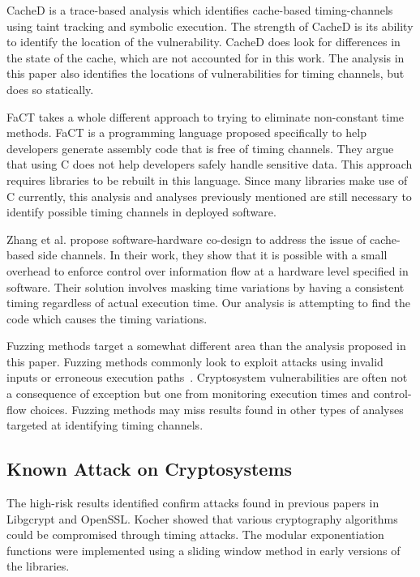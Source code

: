    CacheD is a trace-based analysis which identifies cache-based timing-channels
   using taint tracking and symbolic execution\cite{wang2017cached}. The
   strength of CacheD is its ability to identify the location of the
   vulnerability. CacheD does look for differences in the state of the cache,
   which are not accounted for in this work. The analysis in this paper also
   identifies the locations of vulnerabilities for timing channels, but does so
   statically.

   FaCT takes a whole different approach to trying to eliminate non-constant
   time methods\cite{cauligi2017fact}. FaCT is a programming language proposed
   specifically to help developers generate assembly code that is free of timing channels.
   They argue that using C does not help developers safely handle sensitive
   data. This approach requires libraries to be rebuilt in this language. Since
   many libraries make use of C currently, this analysis and analyses previously mentioned are
   still necessary to identify possible timing channels in deployed software.

   Zhang et al. propose software-hardware co-design to address the issue of
   cache-based side channels\cite{zhang2015hardware}. In their work, they show
   that it is possible with a small overhead to enforce control over information
   flow at a hardware level specified in software. Their solution involves
   masking time variations by having a consistent timing regardless of actual
   execution time. Our analysis is attempting to find the code which causes the
   timing variations.

   Fuzzing methods target a somewhat different area than the analysis proposed
   in this paper. Fuzzing methods commonly look to exploit attacks using invalid
   inputs or erroneous execution paths~\cite{sutton2007fuzzing}. Cryptosystem vulnerabilities are often
   not a consequence of exception but one from monitoring execution times and
   control-flow choices. Fuzzing methods may miss results found in other types
   of analyses targeted at identifying timing channels.

\subsection{Known Attack on Cryptosystems}
   The high-risk results identified confirm attacks found in previous papers in
   Libgcrypt and OpenSSL. Kocher showed that various cryptography
   algorithms could be compromised through timing
   attacks\cite{kochertiming}. The modular exponentiation functions were
   implemented using a sliding window method in early versions of the libraries.

